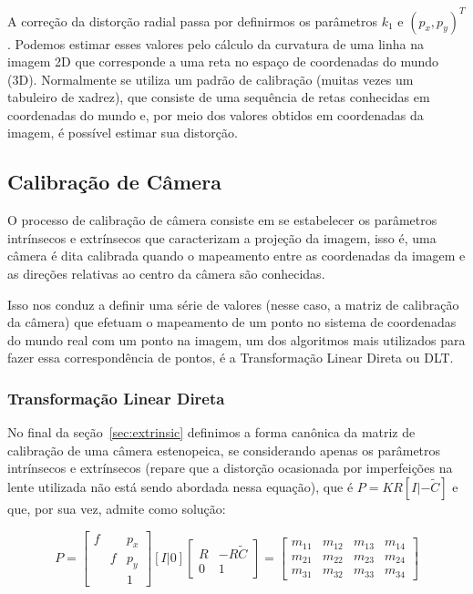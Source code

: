 \documentclass[ecp,tc]{iiufrgs}
\begin{document}
A correção da distorção radial passa por definirmos os parâmetros $ k_1 $ e $ (p_x, p_y)^T $. Podemos estimar esses valores pelo cálculo da curvatura de uma linha na imagem 2D que corresponde a uma reta no espaço de coordenadas do mundo (3D). Normalmente se utiliza um padrão de calibração (muitas vezes um tabuleiro de xadrez), que consiste de uma sequência de retas conhecidas em coordenadas do mundo e, por meio dos valores obtidos em coordenadas da imagem, é possível estimar sua distorção.

\subsection{Calibração de Câmera}


O processo de calibração de câmera consiste em se estabelecer os parâmetros intrínsecos e extrínsecos que caracterizam a projeção da imagem, isso é, uma câmera é dita calibrada quando o mapeamento entre as coordenadas da imagem e as direções  relativas ao centro da câmera são conhecidas.

Isso nos conduz a definir uma série de valores (nesse caso, a matriz de calibração da câmera) que efetuam o mapeamento de um ponto no sistema de coordenadas do mundo real com um ponto na imagem, um dos algoritmos mais utilizados para fazer essa correspondência de pontos, é a Transformação Linear Direta ou DLT.

\subsubsection{Transformação Linear Direta}

No final da seção~\ref{sec:extrinsic} definimos a forma canônica da matriz de calibração de uma câmera estenopeica, se considerando apenas os parâmetros intrínsecos e extrínsecos (repare que a distorção ocasionada por imperfeições na lente utilizada não está sendo abordada nessa equação), que é $ P = KR[I|-\widetilde{C}] $ e que, por sua vez, admite como solução:

\[
P = \begin{bmatrix} f & & p_x \\ & f & p_y \\ & & 1 \end{bmatrix} [I|0] 
\begin{bmatrix} R & -R\widetilde{C} \\ 0 & 1 \end{bmatrix} = 
\begin{bmatrix} m_{11} & m_{12} & m_{13} & m_{14} \\ m_{21} & m_{22} & m_{23} & m_{24} \\ m_{31} & m_{32} & m_{33} & m_{34} \end{bmatrix}
\]
\end{document}
